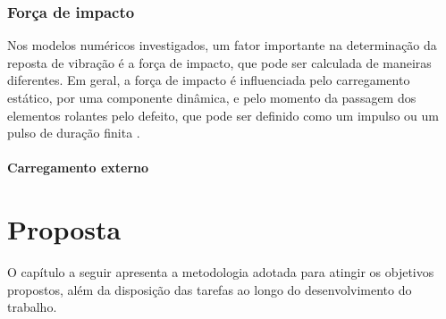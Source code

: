 \documentclass[12pt,openright,oneside,a4paper,
	chapter=TITLE,section=TITLE,
	english,brazil]{abntex2}
\begin{document}
	\subsection{Força de impacto}
	Nos modelos numéricos investigados, um fator importante na determinação da reposta de vibração é a força de impacto, que pode ser calculada de maneiras diferentes. Em geral, a força de impacto é influenciada pelo carregamento estático, por uma componente dinâmica, e pelo momento da passagem dos elementos rolantes pelo defeito, que pode ser definido como um impulso \cite{mcfadden:1984,sassi:2007,cong:2013} ou um pulso de duração finita \cite{tandon:1997}.
	
	\subsubsection{Carregamento externo}
	

	\chapter{Proposta}
	O capítulo a seguir apresenta a metodologia adotada para atingir os objetivos propostos, além da disposição das tarefas ao longo do desenvolvimento do trabalho.
	
\end{document}
